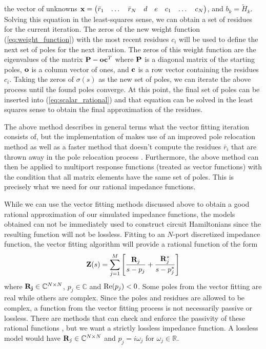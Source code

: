 the vector of unknowns $\vb{x} = \mqty(\bar{r}_1 & \dots & \bar{r}_N & d & e & c_1 & \dots & c_N)$, and $b_k = \tilde{H}_k$. Solving this equation in the least-squares sense, we can obtain a set of residues for the current iteration. The zeros of the new weight function (\ref{eq:weight_function}) with the most recent residues $c_i$ will be used to define the next set of poles for the next iteration. The zeros of this weight function are the eigenvalues of the matrix $\vb{P} - \vb{o}\vb{c}^T$ where $\vb{P}$ is a diagonal matrix of the starting poles, $\vb{o}$ is a column vector of ones, and $\vb{c}$ is a row vector containing the residues $c_i$. Taking the zeros of $\sigma(s)$ as the new set of poles, we can iterate the above process until the found poles converge. At this point, the final set of poles can be inserted into (\ref{eq:scalar_rational}) and that equation can be solved in the least squares sense to obtain the final approximation of the residues. 

The above method describes in general terms what the vector fitting iteration consists of, but the implementation of \cite{matrix_fitting_toolbox} makes use of an improved pole relocation method \cite{gustavsen_improving_2006} as well as a faster method that doesn't compute the residues $\bar{r}_i$ that are thrown away in the pole relocation process \cite{deschrijver_macromodeling_2008}. Furthermore, the above method can then be applied to multiport response functions (treated as vector functions) with the condition that all matrix elements have the same set of poles. This is precisely what we need for our rational impedance functions.

While we can use the vector fitting methods discussed above to obtain a good rational approximation of our simulated impedance functions, the models obtained can not be immediately used to construct circuit Hamiltonians since the resulting function will not be lossless. Fitting to an $N$-port discretized impedance function, the vector fitting algorithm will provide a rational function of the form
\begin{equation}
    \vb{Z}(s) = \sum_{j=1}^{M} \left[ \frac{\vb{R}_j}{s-p_j} + \frac{\vb{R}_j^\ast}{s-p_j^\ast} \right]
\end{equation}
where $\vb{R_j} \in \mathbb{C}^{N \times N}$, $p_j \in \mathbb{C}$ and $\operatorname{Re}(p_j) < 0$. Some poles from the vector fitting are real while others are complex. Since the poles and residues are allowed to be complex, a function from the vector fitting process is not necessarily passive or lossless. There are methods that can check and enforce the passivity of these rational functions \cite[Chapters 9 \& 10]{passive_macromodeling}, but we want a strictly lossless impedance function. A lossless model would have $\vb{R}_j \in \mathbb{C}^{N \times N}$ and $p_j=i\omega_j$ for $\omega_j \in \mathbb{R}$.

